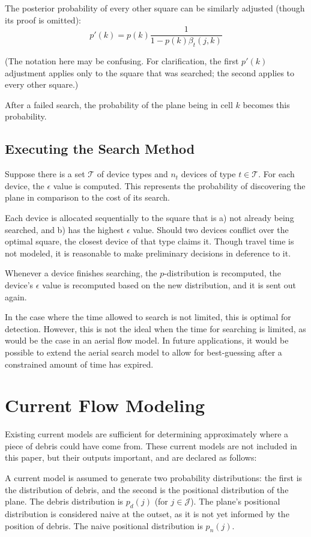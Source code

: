\documentclass[a4paper]{article}
\begin{document}
The posterior probability of every other square can be similarly adjusted (though its proof is omitted): $$p'(k)=p(k)\frac{1}{1-p(k)\beta_t(j,k)}$$

(The notation here may be confusing. For clarification, the first $p'(k)$ adjustment applies only to the square that was searched; the second applies to every other square.)

After a failed search, the probability of the plane being in cell $k$ becomes this probability.

\subsection{Executing the Search Method}

Suppose there is a set $\mathcal{T}$ of device types and $n_t$ devices of type $t\in\mathcal{T}$. For each device, the $\epsilon$ value is computed. This represents the probability of discovering the plane in comparison to the cost of its search.

Each device is allocated sequentially to the square that is a) not already being searched, and b) has the highest $\epsilon$ value. Should two devices conflict over the optimal square, the closest device of that type claims it. Though travel time is not modeled, it is reasonable to make preliminary decisions in deference to it.

Whenever a device finishes searching, the $p$-distribution is recomputed, the device's $\epsilon$ value is recomputed based on the new distribution, and it is sent out again. 

In the case where the time allowed to search is not limited, this is optimal for detection. However, this is not the ideal when the time for searching is limited, as would be the case in an aerial flow model. In future applications, it would be possible to extend the aerial search model to allow for best-guessing after a constrained amount of time has expired.

\section{Current Flow Modeling}

Existing current models are sufficient for determining approximately where a piece of debris could have come from. These current models are not included in this paper, but their outputs important, and are declared as follows:

A current model is assumed to generate two probability distributions: the first is the distribution of debris, and the second is the positional distribution of the plane. The debris distribution is $p_d(j)$ (for $j\in\mathcal{J}$). The plane's positional distribution is considered naive at the outset, as it is not yet informed by the position of debris. The naive positional distribution is $p_n(j)$. 
\end{document}
